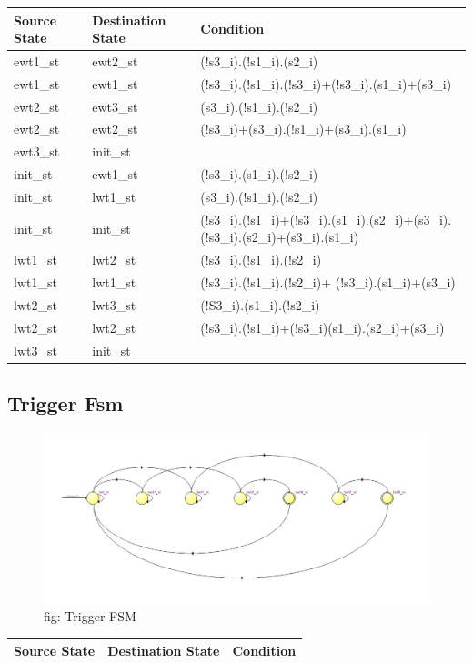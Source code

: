 \documentclass[12pt,a4 paper] {article}
\begin{document}
\begin{center}
	\begin{tabular}{| p{2cm} | p{2cm} | p{11cm} |}
		\hline
		Source State& Destination State & Condition \\
		\hline
		ewt1\_st & ewt2\_st & (!s3\_i).(!s1\_i).(s2\_i) \\
		\hline
		ewt1\_st & ewt1\_st  & (!s3\_i).(!s1\_i).(!s3\_i)+(!s3\_i).(s1\_i)+(s3\_i) \\
		\hline
		ewt2\_st & ewt3\_st & (s3\_i).(!s1\_i).(!s2\_i)\\
		\hline
		ewt2\_st & ewt2\_st & (!s3\_i)+(s3\_i).(!s1\_i)+(s3\_i).(s1\_i)\\
		\hline
		ewt3\_st & init\_st & \\
		\hline
		init\_st & ewt1\_st & (!s3\_i).(s1\_i).(!s2\_i)\\
		\hline
		init\_st & lwt1\_st & (s3\_i).(!s1\_i).(!s2\_i)\\
		\hline
		init\_st & init\_st & (!s3\_i).(!s1\_i)+(!s3\_i).(s1\_i).(s2\_i)+(s3\_i).(!s3\_i).(s2\_i)+(s3\_i).(s1\_i)\\
		\hline	
		lwt1\_st & lwt2\_st & (!s3\_i).(!s1\_i).(!s2\_i)\\
		\hline	
		lwt1\_st & lwt1\_st & (!s3\_i).(!s1\_i).(!s2\_i)+ (!s3\_i).(s1\_i)+(s3\_i)\\
		\hline
		lwt2\_st & lwt3\_st & (!S3\_i).(s1\_i).(!s2\_i) \\
		\hline
		lwt2\_st & lwt2\_st & (!s3\_i).(!s1\_i)+(!s3\_i)(s1\_i).(s2\_i)+(s3\_i) \\
		\hline
		lwt3\_st & init\_st  & \\
		\hline	
	\end{tabular}
\end{center}
\newpage
\subsection{Trigger Fsm}
\begin{figure}[h]
	\centering	
	\includegraphics[scale=0.4]{../png/Trigger.png}
	\newline
	fig: Trigger FSM\\
\end{figure}
\begin{center}
	\begin{tabular}{| p{2cm} | p{2cm} | p{11cm} |}
		\hline
		Source State& Destination State & Condition \\
		\hline	
		
			
	\end{tabular}	
\end{center}	
\newpage
\end{document}
